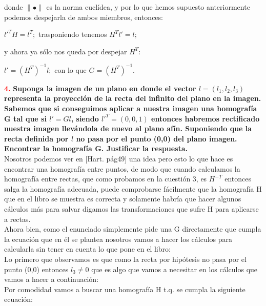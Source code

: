 \documentclass[10pt,a4paper]{article}
\begin{document}
donde $\parallel \bullet \parallel$ es la norma euclídea, y por lo que hemos supuesto anteriormente podemos despejarla de ambos miembros, entonces:\\

\begin{center}
$l'^TH=l^T;$ trasponiendo tenemos $H^Tl'=l;$
\end{center}

y ahora ya sólo nos queda por despejar $H^T$:\\

\begin{center}
$l'=(H^T)^{-1}l;$ con lo que $G=(H^T)^{-1}$.
\end{center}

\textcolor{red}{\textbf{4.}} \textbf{Suponga la imagen de un plano en donde el vector $l=(l_1,l_2,l_3)$ representa la proyección de la recta del infinito del plano en la imagen. Sabemos que si conseguimos aplicar a nuestra imagen una homografía G tal que si $l'=Gl$, siendo $l'^T=(0,0,1)$ entonces habremos rectificado nuestra imagen llevándola de nuevo al plano afín. Suponiendo que la recta definida por $l$ no pasa por el punto (0,0) del plano imagen. Encontrar la homografía G. Justificar la respuesta.}\\

Nosotros podemos ver en [Hart. pág49] una idea pero esto lo que hace es encontrar una homografía entre puntos, de modo que cuando calculamos la homografía entre rectas, que como probamos en la cuestión 3, es $H^{-T}$ entonces salga la homografía adecuada, puede comprobarse fácilmente que la homografía H que en el libro se muestra es correcta y solamente habría que hacer algunos cálculos más para salvar digamos las transformaciones que sufre H para aplicarse a rectas.\\

Ahora bien, como el enunciado simplemente pide una G directamente que cumpla la ecuación que en él se plantea nosotros vamos a hacer los cálculos para calcularla sin tener en cuenta lo que pone en el libro:\\

Lo primero que observamos es que como la recta por hipótesis no pasa por el punto (0,0) entonces $l_3 \neq 0$ que es algo que vamos a necesitar en los cálculos que vamos a hacer a continuación:\\

Por comodidad vamos a buscar una homografía H t.q. se cumpla la siguiente ecuación:\\
\end{document}
